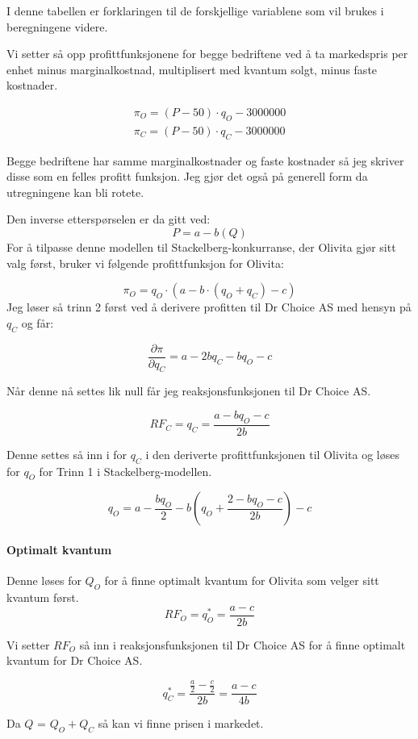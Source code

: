 \documentclass[
  12pt,
  a4paper,
  DIV=11,
  numbers=noendperiod]{scrartcl}
\let\oldparagraph\paragraph
\renewcommand{\paragraph}[1]{\oldparagraph{#1}\mbox{}}
\begin{document}
I denne tabellen er forklaringen til de forskjellige variablene som vil
brukes i beregningene videre.

Vi setter så opp profittfunksjonene for begge bedriftene ved å ta
markedspris per enhet minus marginalkostnad, multiplisert med kvantum
solgt, minus faste kostnader.

\begin{align*}
\pi_O=(P-50) \cdot q_O-3000000 \\
\pi_C=(P-50) \cdot q_C-3000000
\end{align*}

Begge bedriftene har samme marginalkostnader og faste kostnader så jeg
skriver disse som en felles profitt funksjon. Jeg gjør det også på
generell form da utregningene kan bli rotete.

Den inverse etterspørselen er da gitt ved: \[
P = a - b(Q)
\] For å tilpasse denne modellen til Stackelberg-konkurranse, der
Olivita gjør sitt valg først, bruker vi følgende profittfunksjon for
Olivita:

\[
\pi_O = q_O \cdot (a - b \cdot (q_O + q_C) - c) 
\] Jeg løser så trinn 2 først ved å derivere profitten til Dr Choice AS
med hensyn på \(q_C\) og får:

\[
\frac{\partial \pi}{\partial q_C} = a- 2bq_C - bq_O -c
\]

Når denne nå settes lik null får jeg reaksjonsfunksjonen til Dr Choice
AS.

\[
RF_C = q_C= \frac{a-bq_O - c}{2b}
\]

Denne settes så inn i for \(q_C\) i den deriverte profittfunksjonen til
Olivita og løses for \(q_O\) for Trinn 1 i Stackelberg-modellen.

\[
q_O = a-\frac{b q_O}{2} - b \left(q_O + \frac{2-b q_O - c}{2b}\right)-c
\]

\paragraph{Optimalt kvantum}\label{optimalt-kvantum}

Denne løses for \(Q_O\) for å finne optimalt kvantum for Olivita som
velger sitt kvantum først. \[
RF_O = q_O^* = \frac{a-c}{2b}
\]

Vi setter \(RF_O\) så inn i reaksjonsfunksjonen til Dr Choice AS for å
finne optimalt kvantum for Dr Choice AS.

\[
q_C^* = \frac{\frac{a}{2}-\frac{c}{2}}{2b} = \frac{a-c}{4b}
\]

Da \(Q\) = \(Q_O + Q_C\) så kan vi finne prisen i markedet.
\end{document}
